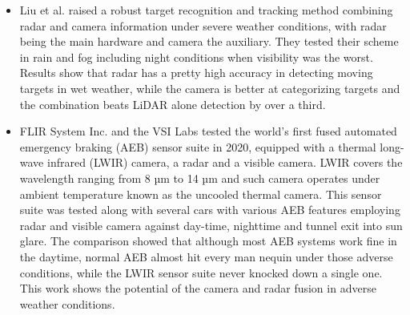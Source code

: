 \documentclass[rnd]{mas_proposal}
\begin{document}
\begin{itemize}
    \item Liu et al. \cite{liu2021robust} raised a robust target recognition and tracking method combining radar and camera information under severe weather conditions, with radar being the main hardware and camera the auxiliary. They tested their scheme in rain and fog including night conditions when visibility was the worst. Results show that radar has a pretty high accuracy in detecting moving targets in wet weather, while the camera is better at categorizing targets and the combination beats LiDAR alone detection by over a third.
    
    \item FLIR System Inc. \cite{fused_aeb} and the VSI Labs \cite{VSILabs} tested the world’s first fused automated emergency braking (AEB) sensor suite in 2020, equipped with a thermal long-wave infrared (LWIR) camera, a radar and a visible camera. LWIR covers the wavelength ranging from 8 µm to 14 µm and such camera operates under ambient temperature known as the uncooled thermal camera. This sensor suite was tested along with several cars with various AEB features employing radar and visible camera against day-time, nighttime and tunnel exit into sun glare. The comparison showed that although most AEB systems work fine in the daytime, normal AEB almost hit every man nequin under those adverse conditions, while the LWIR sensor suite never knocked down a single one. This work shows the potential of the camera and radar fusion in adverse weather conditions.
    

\end{itemize}
\end{document}
